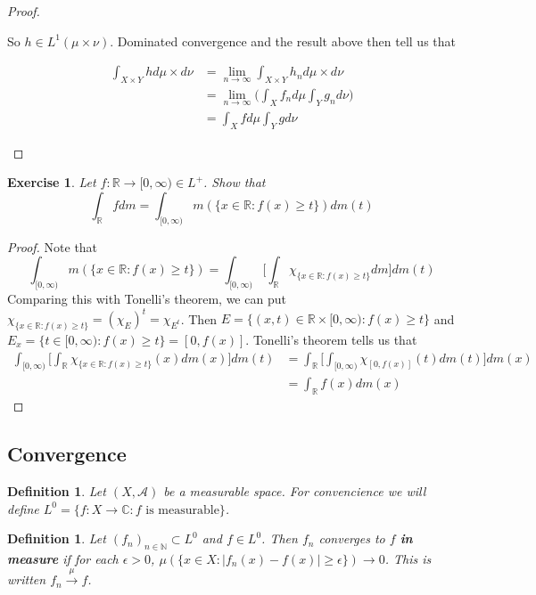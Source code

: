 \documentclass[12pt]{amsart}
\newtheorem{defn}[thm]{Definition}
\newtheorem{ex}[thm]{Exercise}
\newcommand{\ep}{\epsilon}
\newcommand{\C}{\mathbb{C}}
\newcommand{\N}{\mathbb{N}}
\newcommand{\R}{\mathbb{R}}
\newcommand{\MA}{\mathcal{A}}
\newcommand{\Rg}{[0,\infty)}
\newcommand{\limn}{\lim \limits_{n \rightarrow \infty}}
\begin{document}
\begin{proof}
\begin{enumerate}
So $h \in L^1(\mu \times \nu)$. Dominated convergence and the result above then tell us that 

\begin{align*}
\int_{X \times Y} h d\mu \times d\nu 
&= \limn \int_{X \times Y} h_n d\mu \times d\nu \\
&= \limn \bigg( \int_X f_n d\mu \int_Y g_n d\nu \bigg)\\
&= \int_X f d\mu \int_Y g d\nu
\end{align*}

\end{enumerate}
\end{proof}

\begin{ex}
Let $f:\R \rightarrow \Rg \in L^+$. Show that $$\int_{\R}fdm = \int_{\Rg}m(\{x \in \R: f(x) \geq t\}) dm(t)$$
\end{ex}

\begin{proof}
Note that $$\int_{\Rg}m(\{x \in \R: f(x) \geq t\}) = \int_{\Rg} \bigg[\int_{\R} \chi_{\{x \in \R: f(x) \geq t\}}dm \bigg]dm(t)$$
Comparing this with Tonelli's theorem, we can put $\chi_{\{x \in \R: f(x) \geq t\}} = (\chi_{E})^t = \chi_{E^t}$. Then $E = \{(x,t) \in \R \times \Rg: f(x) \geq t\}$ and $E_x = \{t \in \Rg: f(x) \geq t\} = [0,f(x)]$. Tonelli's theorem tells us that 
\begin{align*}
\int_{\Rg} \bigg[\int_{\R} \chi_{\{x \in \R: f(x) \geq t\}}(x) dm(x) \bigg]dm(t)
&= \int_{\R} \bigg[ \int_{\Rg} \chi_{[0,f(x)]}(t) dm(t) \bigg] dm(x)\\
&= \int_{\R} f(x) dm(x)
\end{align*} 
\end{proof}

\subsection{Convergence}

\begin{defn}
Let $(X, \MA)$ be a measurable space. For convencience we will define $L^0 = \{f:X \rightarrow \C: f \text{ is measurable}\}$.
\end{defn}

\begin{defn}
Let $(f_n)_{n \in \N} \subset L^0$ and $f \in L^0$. Then $f_n$ converges to $f$ \textbf{in measure} if for each $\ep > 0$, $\mu(\{x \in X: |f_n(x) - f(x)| \geq \ep \}) \rightarrow 0$. This is written $f_n \xrightarrow{\mu} f$.
\end{defn}
\end{document}
